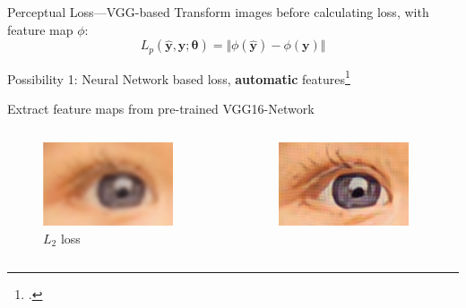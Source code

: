\documentclass{beamer}
\begin{document}
\begin{frame}{Perceptual Loss---VGG-based}
Transform images before calculating loss, with feature map $\phi$:
\begin{equation*}
    L_p( \hat{\bm{y}}, \bm{y}; \bm{\theta}) = \Vert \phi( \bm{\hat{y}} ) - \phi( \bm{y}) \Vert
\end{equation*}

  \alert{Possibility 1}: Neural Network based loss, \textbf{automatic} features\footcite{PerceptualLoss}

  Extract feature maps from pre-trained VGG16-Network
\begin{columns}
  \begin{column}{0.33\linewidth}
    \begin{figure}[h]
      \centering
        \includegraphics[width=0.9\textwidth]{perceptual_loss_l2}
      \caption*{$L_2$ loss}
    \end{figure}
  \end{column}
  \begin{column}{0.33\linewidth}
    \begin{figure}[h]
      \centering
        \includegraphics[width=0.9\textwidth]{perceptual_loss_vgg}

\end{figure}
\end{column}
\end{columns}
\end{frame}
\end{document}
